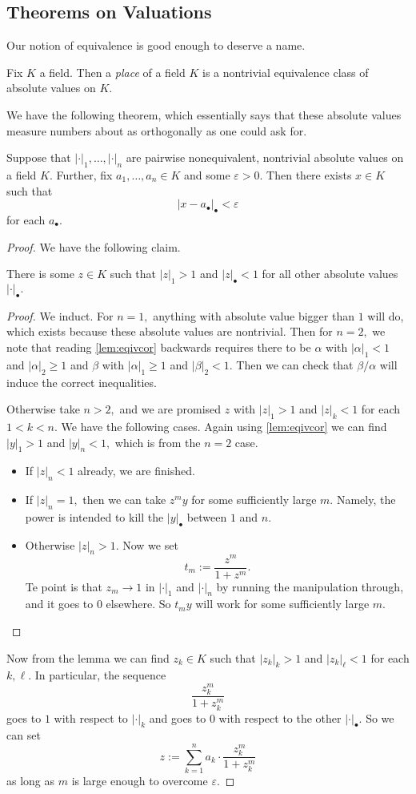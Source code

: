 \documentclass[../notes.tex]{subfiles}
\begin{document}
\subsection{Theorems on Valuations}
Our notion of equivalence is good enough to deserve a name.
\begin{definition}[Place]
	Fix $K$ a field. Then a \textit{place} of a field $K$ is a nontrivial equivalence class of absolute values on $K.$
\end{definition}
We have the following theorem, which essentially says that these absolute values measure numbers about as orthogonally as one could ask for.
\begin{theorem}
	Suppose that $|\cdot|_1,\ldots,|\cdot|_n$ are pairwise nonequivalent, nontrivial absolute values on a field $K.$ Further, fix $a_1,\ldots,a_n\in K$ and some $\varepsilon>0.$ Then there exists $x\in K$ such that
	\[|x-a_\bullet|_\bullet<\varepsilon\]
	for each $a_\bullet.$
\end{theorem}
\begin{proof}
	We have the following claim.
	\begin{lemma}
		There is some $z\in K$ such that $|z|_1>1$ and $|z|_\bullet<1$ for all other absolute values $|\cdot|_\bullet.$
	\end{lemma}
	\begin{proof}
		We induct. For $n=1,$ anything with absolute value bigger than $1$ will do, which exists because these absolute values are nontrivial. Then for $n=2,$ we note that reading \autoref{lem:eqivcor} backwards requires there to be $\alpha$ with $|\alpha|_1<1$ and $|\alpha|_2\ge1$ and $\beta$ with $|\alpha|_1\ge1$ and $|\beta|_2<1.$ Then we can check that $\beta/\alpha$ will induce the correct inequalities.

		Otherwise take $n>2,$ and we are promised $z$ with $|z|_1>1$ and $|z|_k<1$ for each $1<k<n.$ We have the following cases. Again using \autoref{lem:eqivcor} we can find $|y|_1>1$ and $|y|_n<1,$ which is from the $n=2$ case.
		\begin{itemize}
			\item If $|z|_n<1$ already, we are finished.
			\item If $|z|_n=1,$ then we can take $z^my$ for some sufficiently large $m.$ Namely, the power is intended to kill the $|y|_\bullet$ between $1$ and $n.$
			\item Otherwise $|z|_n>1.$ Now we set
			\[t_m:=\frac{z^m}{1+z^m}.\]
			Te point is that $z_m\to1$ in $|\cdot|_1$ and $|\cdot|_n$ by running the manipulation through, and it goes to $0$ elsewhere. So $t_my$ will work for some sufficiently large $m.$
			\qedhere
		\end{itemize}
	\end{proof}
	Now from the lemma we can find $z_k\in K$ such that $|z_k|_k>1$ and $|z_k|_\ell<1$ for each $k,\ell.$ In particular, the sequence
	\[\frac{z_k^m}{1+z_k^m}\]
	goes to $1$ with respect to $|\cdot|_k$ and goes to $0$ with respect to the other $|\cdot|_\bullet.$ So we can set
	\[z:=\sum_{k=1}^na_k\cdot\frac{z_k^m}{1+z_k^m}\]
	as long as $m$ is large enough to overcome $\varepsilon.$
\end{proof}
\end{document}
